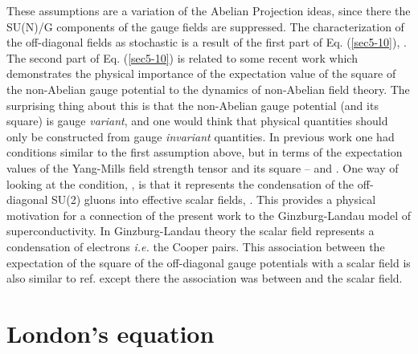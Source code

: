 \documentclass[a4paper,aps,showpacs]{revtex4}
\begin{document}
These assumptions are a variation of the Abelian Projection
ideas, since there the SU(N)/G components of the gauge fields
are suppressed. The characterization of the off-diagonal fields
as stochastic is a result of the first part of Eq.
(\ref{sec5-10}), \coordHE{}.
The second part of Eq. (\ref{sec5-10}) is related to some
recent work \cite{gubarev} \cite{kondo2} which demonstrates the
physical importance of the expectation value of the square of the
non-Abelian gauge potential to the dynamics of non-Abelian field
theory. The surprising thing about this is that the non-Abelian
gauge potential (and its square)
is gauge {\it variant}, and one would think that
physical quantities should only be constructed from gauge
{\it invariant} quantities. In previous work \cite{amb}
\cite{cw} \cite{cw1} one had conditions similar to the first
assumption above, but in terms of the expectation values of
the Yang-Mills field strength tensor and its square --
\coordHE{} and
\coordHE{}.
One way of looking at the condition,
\coordHE{}, is that it represents
the condensation of the off-diagonal SU(2) gluons into
effective scalar fields, \coordHE{}. This provides a physical
motivation for a connection of the present work to
the Ginzburg-Landau model of superconductivity. In
Ginzburg-Landau theory the scalar field represents a
condensation of electrons {\it i.e.} the Cooper pairs.
This association between the expectation of the square
of the off-diagonal gauge potentials with a scalar field
is also similar to ref. \cite{cw} except
there the association was between \coordHE{}
and the scalar field.


\section{London's equation}
\end{document}
